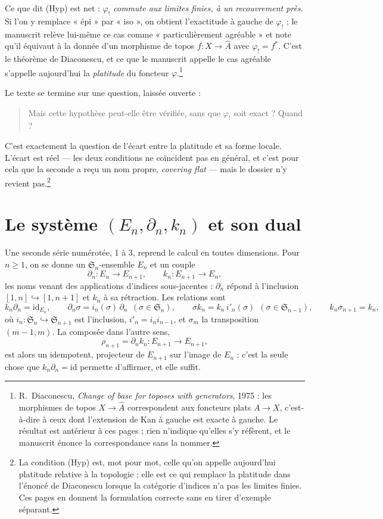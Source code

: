 \documentclass[11pt,a4paper]{article}
\begin{document}
Ce que dit (Hyp) est net : \emph{$\varphi_{!}$ commute aux limites finies, à
un recouvrement près}. Si l'on y remplace « épi » par « iso », on obtient
l'exactitude à gauche de $\varphi_{!}$ ; le manuscrit relève lui-même ce cas
comme « particulièrement agréable » et note qu'il équivaut à la donnée d'un
morphisme de topos $f \colon X \to \widehat{A}$ avec $\varphi_{!} = f^{*}$.
C'est le théorème de Diaconescu, et ce que le manuscrit appelle le cas agréable
s'appelle aujourd'hui la \emph{platitude} du foncteur
$\varphi$.\footnote{R.~Diaconescu, \emph{Change of base for toposes with
generators}, 1975 : les morphismes de topos $X \to \widehat{A}$ correspondent
aux foncteurs plats $A \to X$, c'est-à-dire à ceux dont l'extension de Kan à
gauche est exacte à gauche. Le résultat est antérieur à ces pages ; rien
n'indique qu'elles s'y réfèrent, et le manuscrit énonce la correspondance sans
la nommer.}

Le texte se termine sur une question, laissée ouverte :

\begin{quote}
Mais cette hypothèse peut-elle être vérifiée, sans que $\varphi_{!}$ soit
exact ? Quand ?
\end{quote}

C'est exactement la question de l'écart entre la platitude et sa forme locale.
L'écart est réel — les deux conditions ne coïncident pas en général, et c'est
pour cela que la seconde a reçu un nom propre, \emph{covering flat} — mais le
dossier n'y revient pas.\footnote{La condition (Hyp) est, mot pour mot, celle
qu'on appelle aujourd'hui platitude relative à la topologie ; elle est ce qui
remplace la platitude dans l'énoncé de Diaconescu lorsque la catégorie
d'indices n'a pas les limites finies. Ces pages en donnent la formulation
correcte sans en tirer d'exemple séparant.}

\section*{Le système $(E_{n}, \partial_{n}, k_{n})$ et son dual}

Une seconde série numérotée, 1 à 3, reprend le calcul en toutes dimensions.
Pour $n \geq 1$, on se donne un $\mathfrak{S}_{n}$-ensemble $E_{n}$ et un
couple
\[
  \partial_{n} \colon E_{n} \longrightarrow E_{n+1}, \qquad
  k_{n} \colon E_{n+1} \longrightarrow E_{n},
\]
les noms venant des applications d'indices sous-jacentes : $\partial_{n}$
répond à l'inclusion $[1,n] \hookrightarrow [1,n+1]$ et $k_{n}$ à sa
rétraction. Les relations sont
\[
  k_{n}\partial_{n} = \mathrm{id}_{E_{n}}, \qquad
  \partial_{n}\sigma = i_{n}(\sigma)\,\partial_{n} \ \ (\sigma \in \mathfrak{S}_{n}),
  \qquad
  \sigma k_{n} = k_{n}\,i'_{n}(\sigma) \ \ (\sigma \in \mathfrak{S}_{n-1}),
  \qquad
  k_{n}\sigma_{n+1} = k_{n},
\]
où $i_{n} \colon \mathfrak{S}_{n} \hookrightarrow \mathfrak{S}_{n+1}$ est
l'inclusion, $i'_{n} = i_{n}i_{n-1}$, et $\sigma_{m}$ la transposition
$(m-1,m)$. La composée dans l'autre sens,
\[
  \rho_{n+1} = \partial_{n}k_{n} \colon E_{n+1} \longrightarrow E_{n+1},
\]
est alors un idempotent, projecteur de $E_{n+1}$ sur l'image de $E_{n}$ : c'est
la seule chose que $k_{n}\partial_{n} = \mathrm{id}$ permette d'affirmer, et
elle suffit.
\end{document}
